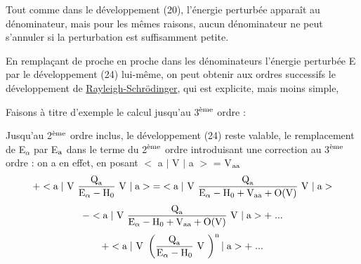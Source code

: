 Tout comme dans le développement (20), l'énergie perturbée apparaît au dénominateur,
mais pour les mêmes raisons, aucun dénominateur ne peut s'annuler si la
perturbation est suffisamment petite.

En remplaçant de proche en proche dans les dénominateurs l'énergie
perturbée E par le développement (24) lui-même, on peut obtenir aux ordres
successifs le développement de \ul{Rayleigh-Schrödinger}, qui est explicite, mais
moins simple,

Faisons à titre d'exemple le calcul jusqu'au 3$^{\text{ème}}$ ordre :

Jusqu'au 2$^{\text{ème}}$ ordre inclus, le développement (24) reste valable, le
remplacement de E$_\alpha$ par E$_{\text{a}}$ dans le terme du 2$^{\text{ème}}$ ordre introduisant
une correction au 3$^{\text{ème}}$ ordre : on a en effet, en posant $<$ a $|$ V $|$ a $>$ = V$_{\text{aa}}$
\[
+<\text{a}\;|\text{ V }\frac{\text{Q}_{\text{a}}}{\text{E}_\alpha-\text{H}_0}\text{ V }|\;\text{a}>\;=\;
<\text{a}\;|\text{ V }\frac{\text{Q}_{\text{a}}}{\text{E}_\alpha-\text{H}_0+\text{V}_{\text{aa}}+\text{O(V)}}\text{ V }|\;\text{a}>
\]
\[
-<\text{a}\;|\text{ V }\frac{\text{Q}_{\text{a}}}{\text{E}_\alpha-\text{H}_0+\text{V}_{\text{aa}}+\text{O(V)}}\text{ V }|\;\text{a}>+\;...
\]
\[
+<\text{a}\;|\text{ V }\left(\frac{\text{Q}_{\text{a}}}{\text{E}_\alpha-\text{H}_0}\text{ V }\right)^{\text{n}}|\;\text{a}>+\;...
\]

